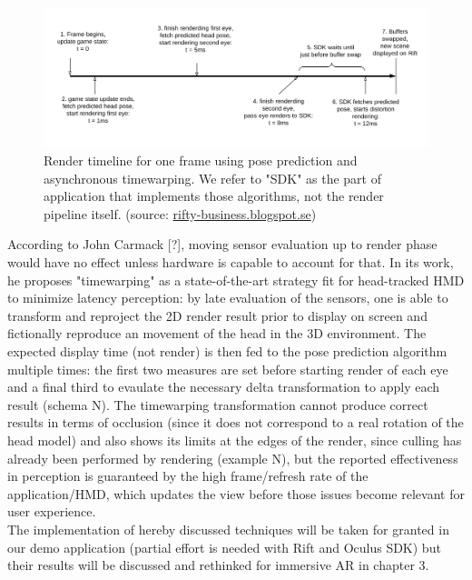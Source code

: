 \begin{figure}
\centering
\includegraphics[width=\linewidth]{schemas/timewarp-timeline}
\caption{Render timeline for one frame using pose prediction and asynchronous timewarping. We refer to "SDK" as the part of application that implements those algorithms, not the render pipeline itself. (source: \href{http://rifty-business.blogspot.se/2014/08/using-timewarp-on-oculus-rift.html}{rifty-business.blogspot.se})}
\label{fig:timewarp_timeline}
\end{figure}

According to John Carmack [?], moving sensor evaluation up to render phase would have no effect unless hardware is capable to account for that. In its work, he proposes "timewarping" as a state-of-the-art strategy fit for head-tracked HMD to minimize latency perception: by late evaluation of the sensors, one is able to transform and reproject the 2D render result prior to display on screen and fictionally reproduce an movement of the head in the 3D environment. The expected display time (not render) is then fed to the pose prediction algorithm multiple times: the first two measures are set before starting render of each eye and a final third to evaulate the necessary delta transformation to apply each result (schema N). The timewarping transformation cannot produce correct results in terms of occlusion (since it does not correspond to a real rotation of the head model) and also shows its limits at the edges of the render, since culling has already been performed by rendering (example N), but the reported effectiveness in perception is guaranteed by the high frame/refresh rate of the application/HMD, which updates the view before those issues become relevant for user experience.\\
The implementation of hereby discussed techniques will be taken for granted in our demo application (partial effort is needed with Rift and Oculus SDK) but their results will be discussed and rethinked for immersive AR in chapter 3.

